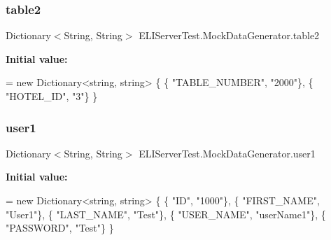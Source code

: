 \subsubsection{\texorpdfstring{table2}{table2}}
{\footnotesize\ttfamily Dictionary$<$String, String$>$ E\+L\+I\+Server\+Test.\+Mock\+Data\+Generator.\+table2}

{\bfseries Initial value\+:}
\begin{DoxyCode}
= \textcolor{keyword}{new} Dictionary<string, string> \{
            \{ \textcolor{stringliteral}{"TABLE\_NUMBER"}, \textcolor{stringliteral}{"2000"}\},
            \{ \textcolor{stringliteral}{"HOTEL\_ID"}, \textcolor{stringliteral}{"3"}\}
        \}
\end{DoxyCode}
\mbox{\label{class_e_l_i_server_test_1_1_mock_data_generator_a37b1c657a54b2b653816db24cba58519}} 
\subsubsection{\texorpdfstring{user1}{user1}}
{\footnotesize\ttfamily Dictionary$<$String, String$>$ E\+L\+I\+Server\+Test.\+Mock\+Data\+Generator.\+user1}

{\bfseries Initial value\+:}
\begin{DoxyCode}
= \textcolor{keyword}{new} Dictionary<string, string> \{
            \{ \textcolor{stringliteral}{"ID"}, \textcolor{stringliteral}{"1000"}\},
            \{ \textcolor{stringliteral}{"FIRST\_NAME"}, \textcolor{stringliteral}{"User1"}\},
            \{ \textcolor{stringliteral}{"LAST\_NAME"}, \textcolor{stringliteral}{"Test"}\},
            \{ \textcolor{stringliteral}{"USER\_NAME"}, \textcolor{stringliteral}{"userName1"}\},
            \{ \textcolor{stringliteral}{"PASSWORD"}, \textcolor{stringliteral}{"Test"}\}
        \}
\end{DoxyCode}
\mbox{\label{class_e_l_i_server_test_1_1_mock_data_generator_a493d22ff32a1a83f130c1e2775dc14ec}} 
